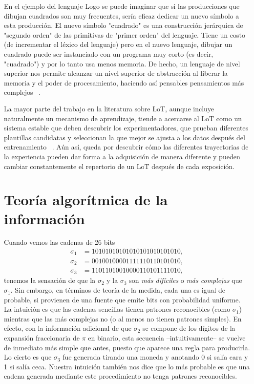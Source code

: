 En el ejemplo del lenguaje Logo se puede imaginar que si las producciones que dibujan cuadrados son muy frecuentes, sería eficaz dedicar un nuevo símbolo a esta producción. El nuevo símbolo "cuadrado" es una construcción jerárquica de "segundo orden" de las primitivas de "primer orden" del lenguaje. Tiene un costo (de incrementar el léxico del lenguaje) pero en el nuevo lenguaje, dibujar un cuadrado puede ser instanciado con un programa muy corto (es decir, "cuadrado") y por lo tanto usa menos memoria. De hecho, un lenguaje de nivel superior nos permite alcanzar un nivel superior de abstracción al liberar la memoria y el poder de procesamiento, haciendo así pensables pensamientos más complejos ~\cite{minsky1967computation, murphy1988comprehending}.

La mayor parte del trabajo en la literatura sobre LoT, aunque incluye naturalmente un mecanismo de aprendizaje, tiende a acercarse al LoT como un sistema estable que deben descubrir los experimentadores, que prueban diferentes plantillas candidatas y seleccionan la que mejor se ajusta a los datos después del entrenamiento ~\cite{goodman2008rational, kemp2012exploring, piantadosi2016logical}. Aún así, queda por descubrir cómo las diferentes trayectorias de la experiencia pueden dar forma a la adquisición de manera diferente y pueden cambiar constantemente el repertorio de un LoT después de cada exposición.


\section{Teoría algorítmica de la información}


Cuando vemos las cadenas de 26 bits
\begin{align*}
\sigma_1 &= 10101010101010101010101010,\\
\sigma_2 &= 00100100001111110110101010, \\
\sigma_3 &= 11011010010000110101111010,
\end{align*}
tenemos la sensación de que la $\sigma_2$ y la $\sigma_3$
son {\em más difíciles} o {\em más complejas} que $\sigma_1$. Sin embargo, en términos de
teoría de la medida, cada una es igual de probable, si provienen de una fuente que emite bits 
con probabilidad uniforme. 
La intuición es que las cadenas sencillas tienen patrones reconocibles (como $\sigma_1$) mientras
que las más complejas no (o al menos no tienen patrones simples). 
En efecto, con la información adicional de que $\sigma_2$ se compone de los dígitos de 
la expansión fraccionaria de $\pi$ en binario, esta secuencia --intuitivamente-- se vuelve de inmediato más simple que antes, puesto que aparece una regla para producirla. Lo cierto es que $\sigma_3$ fue generada tirando una moneda y anotando 0 si salía cara y 1 si salía ceca. Nuestra intuición también nos dice que lo más probable es que una cadena generada mediante este procedimiento no tenga patrones reconocibles.

